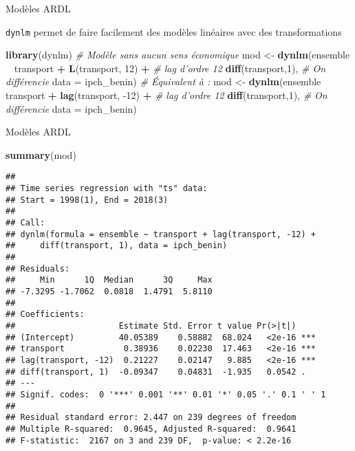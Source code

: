 \documentclass[10pt,xcolor=table,color={dvipsnames,usenames},ignorenonframetext,usepdftitle=false,french]{beamer}
\newenvironment{Shaded}{\begin{snugshade}}{\end{snugshade}}
\newcommand{\CommentTok}[1]{\textcolor[rgb]{0.56,0.35,0.01}{\textit{#1}}}
\newcommand{\DataTypeTok}[1]{\textcolor[rgb]{0.13,0.29,0.53}{#1}}
\newcommand{\DecValTok}[1]{\textcolor[rgb]{0.00,0.00,0.81}{#1}}
\newcommand{\KeywordTok}[1]{\textcolor[rgb]{0.13,0.29,0.53}{\textbf{#1}}}
\newcommand{\NormalTok}[1]{#1}
\newcommand{\OperatorTok}[1]{\textcolor[rgb]{0.81,0.36,0.00}{\textbf{#1}}}
\newcommand{\StringTok}[1]{\textcolor[rgb]{0.31,0.60,0.02}{#1}}
\begin{document}
\begin{frame}[fragile]{Modèles ARDL}
\protect\hypertarget{moduxe8les-ardl-1}{}

\texttt{dynlm} permet de faire facilement des modèles linéaires avec des
transformations

\begin{Shaded}
\begin{Highlighting}[]
\KeywordTok{library}\NormalTok{(dynlm)}
\CommentTok{# Modèle sans aucun sens économique}
\NormalTok{mod <-}\StringTok{ }\KeywordTok{dynlm}\NormalTok{(ensemble }\OperatorTok{~}\StringTok{  }\NormalTok{transport }\OperatorTok{+}
\StringTok{               }\KeywordTok{L}\NormalTok{(transport, }\DecValTok{12}\NormalTok{) }\OperatorTok{+}\StringTok{ }\CommentTok{# lag d'ordre 12}
\StringTok{               }\KeywordTok{diff}\NormalTok{(transport,}\DecValTok{1}\NormalTok{), }\CommentTok{# On différencie}
             \DataTypeTok{data =}\NormalTok{ ipch_benin)}
\CommentTok{# Équivalent à :}
\NormalTok{mod <-}\StringTok{ }\KeywordTok{dynlm}\NormalTok{(ensemble }\OperatorTok{~}\StringTok{  }\NormalTok{transport }\OperatorTok{+}
\StringTok{               }\KeywordTok{lag}\NormalTok{(transport, }\DecValTok{-12}\NormalTok{) }\OperatorTok{+}\StringTok{ }\CommentTok{# lag d'ordre 12}
\StringTok{               }\KeywordTok{diff}\NormalTok{(transport,}\DecValTok{1}\NormalTok{), }\CommentTok{# On différencie}
             \DataTypeTok{data =}\NormalTok{ ipch_benin)}
\end{Highlighting}
\end{Shaded}

\end{frame}

\begin{frame}[fragile]{Modèles ARDL}
\protect\hypertarget{moduxe8les-ardl-2}{}

\begin{Shaded}
\begin{Highlighting}[]
\KeywordTok{summary}\NormalTok{(mod)}
\end{Highlighting}
\end{Shaded}

\begin{verbatim}
## 
## Time series regression with "ts" data:
## Start = 1998(1), End = 2018(3)
## 
## Call:
## dynlm(formula = ensemble ~ transport + lag(transport, -12) + 
##     diff(transport, 1), data = ipch_benin)
## 
## Residuals:
##     Min      1Q  Median      3Q     Max 
## -7.3295 -1.7062  0.0818  1.4791  5.8110 
## 
## Coefficients:
##                     Estimate Std. Error t value Pr(>|t|)    
## (Intercept)         40.05389    0.58882  68.024   <2e-16 ***
## transport            0.38936    0.02230  17.463   <2e-16 ***
## lag(transport, -12)  0.21227    0.02147   9.885   <2e-16 ***
## diff(transport, 1)  -0.09347    0.04831  -1.935   0.0542 .  
## ---
## Signif. codes:  0 '***' 0.001 '**' 0.01 '*' 0.05 '.' 0.1 ' ' 1
## 
## Residual standard error: 2.447 on 239 degrees of freedom
## Multiple R-squared:  0.9645, Adjusted R-squared:  0.9641 
## F-statistic:  2167 on 3 and 239 DF,  p-value: < 2.2e-16
\end{verbatim}

\end{frame}
\end{document}
